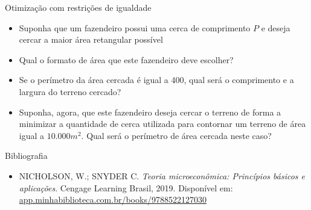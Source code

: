 \documentclass[10pt]{beamer}
\begin{document}
\begin{frame}
    {Otimização com restrições de igualdade}
    \begin{itemize}
        \item Suponha que um fazendeiro possui uma cerca de comprimento $P$ e deseja cercar a maior área retangular possível\bigskip
        \item Qual o formato de área que este fazendeiro deve escolher?\bigskip
        \item Se o perímetro da área cercada é igual a 400, qual será o comprimento e a largura do terreno cercado?\bigskip
        \item Suponha, agora, que este fazendeiro deseja cercar o terreno de forma a minimizar a quantidade de cerca utilizada para contornar um terreno de área igual a $10.000 m^2$. Qual será o perímetro de área cercada neste caso?
    \end{itemize}
\end{frame}

\begin{frame}{Bibliografia }
    \begin{itemize}
        \item NICHOLSON, W.; SNYDER C. \emph{Teoria microeconômica: Princípios básicos e aplicações}. Cengage Learning Brasil, 2019. Disponível em: \href{https://app.minhabiblioteca.com.br/books/9788522127030/}{app.minhabiblioteca.com.br/books/9788522127030}
    \end{itemize}
\end{frame}
\end{document}
